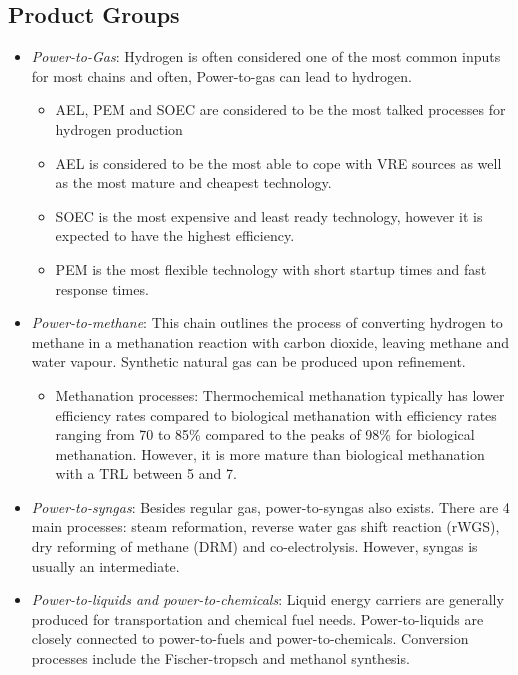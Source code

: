 \documentclass[a4paper]{article}
\begin{document}
\subsection{Product Groups}
    \begin{itemize}
        \item \textit{Power-to-Gas}: Hydrogen is often considered one of the most common inputs for most chains and often, Power-to-gas can lead to hydrogen. 
        \begin{itemize}
            \item AEL, PEM and SOEC are considered to be the most talked processes for hydrogen production
            \item AEL is considered to be the most able to cope with VRE sources as well as the most mature and cheapest technology.
            \item SOEC is the most expensive and least ready technology, however it is expected to have the highest efficiency.
            \item PEM is the most flexible technology with short startup times and fast response times.
        \end{itemize}
        \item \textit{Power-to-methane}: This chain outlines the process of converting hydrogen to methane in a methanation reaction with carbon dioxide, leaving methane and water vapour. Synthetic natural gas can be produced upon refinement.
        \begin{itemize}
            \item Methanation processes: Thermochemical methanation typically has lower efficiency rates compared to biological methanation with efficiency rates ranging from 70 to 85\% compared to the peaks of 98\% for biological methanation. However, it is more mature than biological methanation with a TRL between 5 and 7.
        \end{itemize}
        \item \textit{Power-to-syngas}: Besides regular gas, power-to-syngas also exists. There are 4 main processes: steam reformation, reverse water gas shift reaction (rWGS), dry reforming of methane (DRM) and co-electrolysis. However, syngas is usually an intermediate.
        \item \textit{Power-to-liquids and power-to-chemicals}: Liquid energy carriers are generally produced for transportation and chemical fuel needs. Power-to-liquids are closely connected to power-to-fuels and power-to-chemicals. Conversion processes include the Fischer-tropsch and methanol synthesis.
    \end{itemize}
\end{document}
